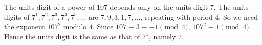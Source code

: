 The units digit of a power of $107$ depends only on the units digit $7$. The units digits of $7^1,7^2,7^3,7^4,7^5,\dots$ are $7,9,3,1,7,\dots$, repeating with period $4$. So we need the exponent $107^2$ modulo $4$. Since $107\equiv3\equiv-1\pmod4$, $107^2\equiv1\pmod4$. Hence the units digit is the same as that of $7^1$, namely $\boxed{7}$.
